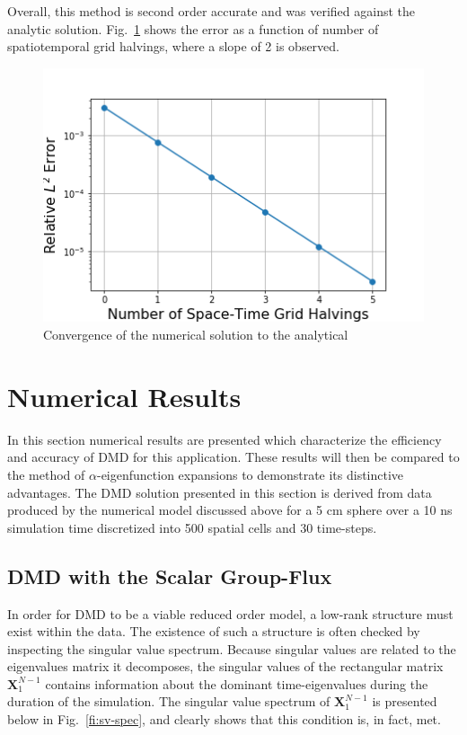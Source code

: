 \documentclass[12pt]{article}
\newcommand{\LFI}[1]{\label{fi:#1}}
\newcommand{\FI}[1]{Fig.~\ref{fi:#1}}
\newcommand{\bfg}{\begin{figure}}
\newcommand{\efg}{\end{figure}}
\begin{document}
Overall, this method is second order accurate and was verified against the analytic solution. 
\FI{2ord} shows the error as a function of number of spatiotemporal grid halvings, where a slope of 2 is observed.

\bfg[h] \centering
	\includegraphics[scale=0.5]{method_convergence.png}
	\caption{Convergence of the numerical solution to the analytical}
	\LFI{2ord}
\efg

\section{Numerical Results}
In this section numerical results are presented which characterize the efficiency and accuracy of DMD 
	for this application.
These results will then be compared to the method of $\alpha$-eigenfunction expansions to
	demonstrate its distinctive advantages.
The DMD solution presented in this section is derived from data produced by the numerical model 
	discussed above for a 5 cm sphere over a 10 ns simulation time discretized into 500 spatial cells and 30 time-steps. 

\subsection{DMD with the Scalar Group-Flux}
In order for DMD to be a viable reduced order model, a low-rank structure must exist within the data.
The existence of such a structure is often checked by inspecting the singular value spectrum.
Because singular values are related to the eigenvalues matrix it decomposes, the singular values of the 	
	rectangular matrix $\bm{X}^{N-1}_1$ contains information about the dominant time-eigenvalues 
	during the duration of the simulation.
The singular value spectrum of  $\bm{X}^{N-1}_1$ is presented below in \FI{sv-spec}, and clearly shows 
	that this condition is, in fact, met.
\end{document}
